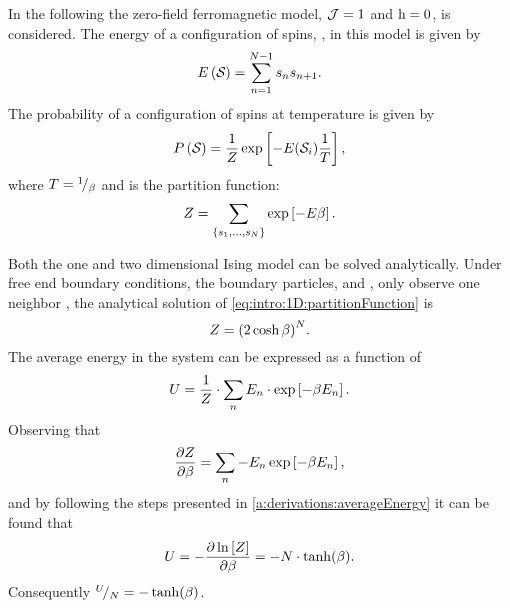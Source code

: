 	In the following the zero-field ferromagnetic model, \ie \mbox{$\mathcal{J} = 1$} and \mbox{$\mathrm{h} = 0$},  is considered. The energy \energy of a configuration of spins, \configuration{}, in this model is given by 
	\begin{equation*}
		E\left(\mathcal{S}_{}\right) = \sum_{n = 1}^{N - 1}s_{n}s_{n+1}.
	\end{equation*}
	The probability of a configuration of spins \configuration{} at temperature \temperature is given by
	\begin{equation}
		\label{eq:intro:1D:configurationProbability}
		P\left(\mathcal{S}_{}\right) = 
		\frac{1}{Z} \exp\left[-{E(\mathcal{S}_{i})}\frac{1}{T}\right],
	\end{equation}
	where $T = {}^{1}\!/_{\beta}$ and \partitionfunction is the partition function:
	\begin{equation}
		\label{eq:intro:1D:partitionFunction}
		Z = \sum_{\left\{s_{1}, \dotsc, s_{N} \right\}} \exp\left[- E \beta \right].
	\end{equation}

	Both the one and two dimensional Ising model can be solved analytically. Under free end boundary conditions, \ie the boundary particles,  and , only observe one neighbor \cite{landau2014guide}, the analytical solution of \cref{eq:intro:1D:partitionFunction} is
	\begin{equation}
		\label{eq:introduced1D:partitionFunctionAnalyticalSolution}
		Z = {(2 \cosh \beta)}^N.
	\end{equation}
	The average energy in the system can be expressed as a function of \partitionfunction \cite{Murray20011Handout}
	\begin{equation*}
		U = \frac{1}{Z} \cdot \sum_{n} E_n \cdot \exp\left[-\beta E_n \right].		
	\end{equation*} 
	Observing that
	\begin{equation*}
		\frac{\partial Z}{\partial \beta} = \sum_{n} - E_n \exp\left[-\beta E_n \right],
	\end{equation*}
	and by following the steps presented in \cref{a:derivations:averageEnergy} it can be found that
	\begin{equation*}
		U = - \frac{\partial \ln \left[ Z \right]}{\partial \beta} = - N \cdot \tanh (\beta).
	\end{equation*}
	Consequently ${}^{U}\!/_{N} = - \tanh (\beta)$.

